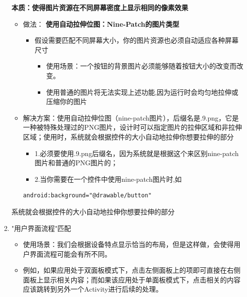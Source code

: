 \documentclass[9pt, b5paper]{article}
\begin{document}
\begin{enumerate}
\textbf{本质：使得图片资源在不同屏幕密度上显示相同的像素效果}
\begin{itemize}
\item 做法： \textbf{使用自动拉伸位图：Nine-Patch的图片类型}
\begin{itemize}
\item 假设需要匹配不同屏幕大小，你的图片资源也必须自动适应各种屏幕尺寸
\begin{itemize}
\item 使用场景：一个按钮的背景图片必须能够随着按钮大小的改变而改变。
\item 使用普通的图片将无法实现上述功能,因为运行时会均匀地拉伸或压缩你的图片
\end{itemize}
\end{itemize}
\item 解决方案：使用自动拉伸位图（nine-patch图片），后缀名是.9.png，它是一种被特殊处理过的PNG图片，设计时可以指定图片的拉伸区域和非拉伸区域；使用时，系统就会根据控件的大小自动地拉伸你想要拉伸的部分
\begin{itemize}
\item 1.必须要使用.9.png后缀名，因为系统就是根据这个来区别nine-patch图片和普通的PNG图片的；
\item 2.当你需要在一个控件中使用nine-patch图片时,如
\end{itemize}
\begin{verbatim}
android:background="@drawable/button"
\end{verbatim}
\end{itemize}

系统就会根据控件的大小自动地拉伸你想要拉伸的部分

\item "用户界面流程"匹配
\label{sec-1-6-1-4}
\begin{itemize}
\item 使用场景：我们会根据设备特点显示恰当的布局，但是这样做，会使得用户界面流程可能会有所不同。
\item 例如，如果应用处于双面板模式下，点击左侧面板上的项即可直接在右侧面板上显示相关内容；而如果该应用处于单面板模式下，点击相关的内容应该跳转到另外一个Activity进行后续的处理。
\end{itemize}


\end{enumerate}
\end{document}
